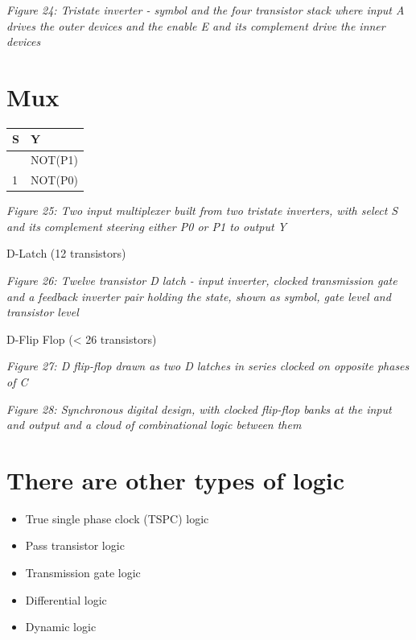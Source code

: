 {
\centering
{}
}

\emph{Figure 24: Tristate inverter - symbol and the four transistor
stack where input A drives the outer devices and the enable E and its
complement drive the inner devices}

\section{Mux}\label{mux}

\begin{longtable}[]{@{}ll@{}}
\toprule\noalign{}
S & Y \\
\midrule\noalign{}
\endhead
\bottomrule\noalign{}
\endlastfoot
0 & NOT(P1) \\
1 & NOT(P0) \\
\end{longtable}


{
\centering
{}
}

\emph{Figure 25: Two input multiplexer built from two tristate
inverters, with select S and its complement steering either P0 or P1 to
output Y}

D-Latch (12 transistors)


{
\centering
{}
}

\emph{Figure 26: Twelve transistor D latch - input inverter, clocked
transmission gate and a feedback inverter pair holding the state, shown
as symbol, gate level and transistor level}

D-Flip Flop (\textless{} 26 transistors)


{
\centering
{}
}

\emph{Figure 27: D flip-flop drawn as two D latches in series clocked on
opposite phases of C}


{
\centering
{}
}

\emph{Figure 28: Synchronous digital design, with clocked flip-flop
banks at the input and output and a cloud of combinational logic between
them}

\section{There are other types of
logic}\label{there-are-other-types-of-logic}

\begin{itemize}
\tightlist
\item
  True single phase clock (TSPC) logic
\item
  Pass transistor logic
\item
  Transmission gate logic
\item
  Differential logic
\item
  Dynamic logic
\end{itemize}

